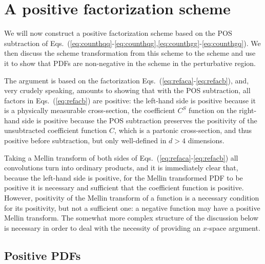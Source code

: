 
\section{A positive factorization scheme}
\label{sec:pos/scheme}

We will now construct a positive factorization scheme based on the POS 
subtraction of
Eqs.~(\ref{eq:counthqq}-\ref{eq:counthqg},\ref{eq:counthgg}-\ref{eq:counthgq}).
We then discuss the scheme transformation from this scheme to the
\msbar{} scheme and use it to show that PDFs are non-negative in the
\msbar{} scheme in the perturbative region.

The argument is based on the factorization
Eqs.~(\ref{eq:refaca}-\ref{eq:refacb}), and, very crudely speaking,
amounts to showing that with the POS subtraction, all factors in
Eqs.~(\ref{eq:refacb}) are positive: the left-hand side is positive
because it is a physically measurable cross-section, the coefficient $C^S$
function on the right-hand side is positive because the POS
subtraction preserves the positivity of the unsubtracted coefficient
function $C$, which is a partonic cross-section, and thus positive
before subtraction, but only well-defined in $d>4$
dimensions.

Taking a Mellin transform of both sides of
Eqs.~(\ref{eq:refaca}-\ref{eq:refacb}) all convolutions turn into
ordinary products, and it is immediately clear that, because the left-hand
side is positive, for the
Mellin transformed PDF to be positive it is necessary and sufficient
that the coefficient  function is positive. However, 
positivity of the Mellin transform of a function is a necessary
condition for its positivity, but not a sufficient one: a negative
function may have a positive Mellin transform. The somewhat more
complex structure of the discussion below is necessary in order
to deal with the necessity of providing an $x$-space argument.


\subsection{Positive PDFs}
\label{sec:pospdf}


